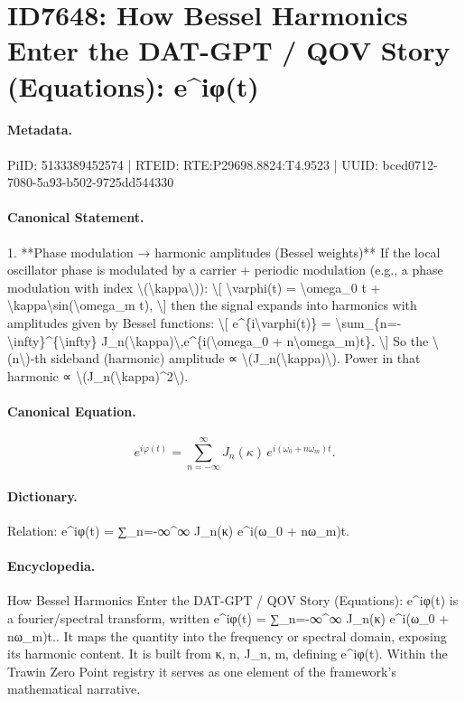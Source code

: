 \section*{ID7648: How Bessel Harmonics Enter the DAT-GPT / QOV Story (Equations): e\textasciicircum{}iφ(t)}
\paragraph{Metadata.}
PiID: 5133389452574 | RTEID: RTE:P29698.8824:T4.9523 | UUID: bced0712-7080-5a93-b502-9725dd544330

\paragraph{Canonical Statement.}
1. **Phase modulation → harmonic amplitudes (Bessel weights)** If the local oscillator phase is modulated by a carrier + periodic modulation (e.g., a phase modulation with index \textbackslash{}(\textbackslash{}kappa\textbackslash{})): \textbackslash{}[ \textbackslash{}varphi(t) = \textbackslash{}omega\_0 t + \textbackslash{}kappa\textbackslash{}sin(\textbackslash{}omega\_m t), \textbackslash{}] then the signal expands into harmonics with amplitudes given by Bessel functions: \textbackslash{}[ e\textasciicircum{}\{i\textbackslash{}varphi(t)\} = \textbackslash{}sum\_\{n=-\textbackslash{}infty\}\textasciicircum{}\{\textbackslash{}infty\} J\_n(\textbackslash{}kappa)\textbackslash{},e\textasciicircum{}\{i(\textbackslash{}omega\_0 + n\textbackslash{}omega\_m)t\}. \textbackslash{}] So the \textbackslash{}(n\textbackslash{})-th sideband (harmonic) amplitude ∝ \textbackslash{}(J\_n(\textbackslash{}kappa)\textbackslash{}). Power in that harmonic ∝ \textbackslash{}(J\_n(\textbackslash{}kappa)\textasciicircum{}2\textbackslash{}).

\paragraph{Canonical Equation.}
\[
e^{i\varphi(t)} = \sum_{n=-\infty}^{\infty} J_n(\kappa)\,e^{i(\omega_0 + n\omega_m)t}.
\]

\paragraph{Dictionary.}
Relation: e\textasciicircum{}iφ(t) = ∑\_n=-∞\textasciicircum{}∞ J\_n(κ) e\textasciicircum{}i(ω\_0 + nω\_m)t.

\paragraph{Encyclopedia.}
How Bessel Harmonics Enter the DAT-GPT / QOV Story (Equations): e\textasciicircum{}iφ(t) is a fourier/spectral transform, written e\textasciicircum{}iφ(t) = ∑\_n=-∞\textasciicircum{}∞ J\_n(κ) e\textasciicircum{}i(ω\_0 + nω\_m)t.. It maps the quantity into the frequency or spectral domain, exposing its harmonic content. It is built from κ, n, J\_n, m, defining e\textasciicircum{}iφ(t). Within the Trawin Zero Point registry it serves as one element of the framework's mathematical narrative.

